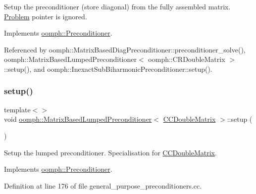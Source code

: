 Setup the preconditioner (store diagonal) from the fully assembled matrix. \hyperlink{classoomph_1_1Problem}{Problem} pointer is ignored. 



Implements \hyperlink{classoomph_1_1Preconditioner_af4886f4efe510e5c9b0eb19422943588}{oomph\+::\+Preconditioner}.



Referenced by oomph\+::\+Matrix\+Based\+Diag\+Preconditioner\+::preconditioner\+\_\+solve(), oomph\+::\+Matrix\+Based\+Lumped\+Preconditioner$<$ oomph\+::\+C\+R\+Double\+Matrix $>$\+::setup(), and oomph\+::\+Inexact\+Sub\+Biharmonic\+Preconditioner\+::setup().

\mbox{\label{classoomph_1_1MatrixBasedLumpedPreconditioner_ae8fe580054f7939179514762c6bf7bc2}} 
\subsubsection{\texorpdfstring{setup()}{setup()}\hspace{0.1cm}{\footnotesize\ttfamily [2/3]}}
{\footnotesize\ttfamily template$<$$>$ \\
void \hyperlink{classoomph_1_1MatrixBasedLumpedPreconditioner}{oomph\+::\+Matrix\+Based\+Lumped\+Preconditioner}$<$ \hyperlink{classoomph_1_1CCDoubleMatrix}{C\+C\+Double\+Matrix} $>$\+::setup (\begin{DoxyParamCaption}{ }\end{DoxyParamCaption})\hspace{0.3cm}{\ttfamily [virtual]}}



Setup the lumped preconditioner. Specialisation for \hyperlink{classoomph_1_1CCDoubleMatrix}{C\+C\+Double\+Matrix}. 



Implements \hyperlink{classoomph_1_1Preconditioner_af4886f4efe510e5c9b0eb19422943588}{oomph\+::\+Preconditioner}.



Definition at line 176 of file general\+\_\+purpose\+\_\+preconditioners.\+cc.

\mbox{\label{classoomph_1_1MatrixBasedLumpedPreconditioner_a05f9fa9aa3ed50ab59b066575a4ff919}} 

